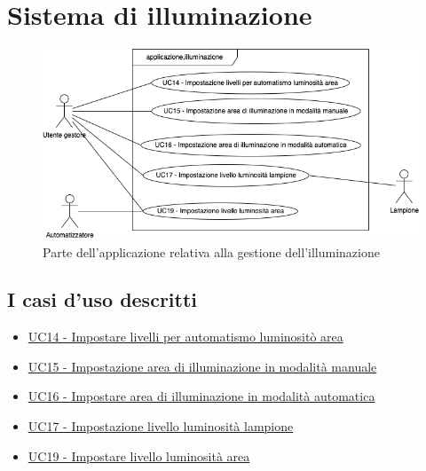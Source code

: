 \section{Sistema di illuminazione}

\begin{figure}[h]
    \includegraphics[width=\textwidth]{contenuti/img/casi_uso_grafici-applicazione,illuminazione.png}
    \caption{Parte dell'applicazione relativa alla gestione dell'illuminazione}
    \label{fig:illuminazione}
\end{figure}

\subsection{I casi d'uso descritti}

\begin{itemize}
    \item \hyperref[uc:14]{UC14 - Impostare livelli per automatismo luminositò area}
    \item \hyperref[uc:15]{UC15 - Impostazione area di illuminazione in modalità manuale}
    \item \hyperref[uc:16]{UC16 - Impostare area di illuminazione in modalità automatica}
    \item \hyperref[uc:17]{UC17 - Impostazione livello luminosità lampione}
    \item \hyperref[uc:19]{UC19 - Impostare livello luminosità area}
\end{itemize}
